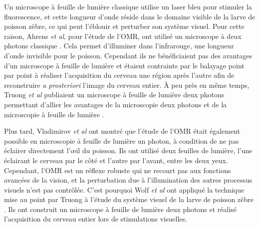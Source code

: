 Un microscope à feuille de lumière classique utilise un laser bleu pour stimuler la fluorescence, et cette longueur d'onde réside dans le domaine visible de la larve de poisson zèbre, ce qui peut l'éblouir et perturber son système visuel. Pour cette raison, Ahrens \emph{et al}, pour l'étude de l'OMR, ont utilisé un microscope à deux photons classique \cite{ahrens_brain-wide_2012}. Cela permet d'illuminer dans l'infrarouge, une longueur d'onde invisible pour le poisson. Cependant ils ne bénéficiaient pas des avantages d'un microscope à feuille de lumière et étaient contraints par le balayage point par point à réaliser l'acquisition du cerveau une région après l'autre afin de reconstruire \emph{a prosteriori} l'image du cerveau entier. À peu près en même temps, Truong \emph{et al} publiaient un microscope à feuille de lumière deux photons permettant d'allier les avantages de la microscopie deux photons et de la microscopie à feuille de lumière \cite{truong_deep_2011}.



Plus tard, Vladimirov \emph{et al} \cite{vladimirov_light-sheet_2014} ont montré que l'étude de l'OMR était également possible en microscopie à feuille de lumière un photon, à condition de ne pas éclairer directement l'œil du poisson. Ils ont utilisé deux feuilles de lumière, l'une éclairant le cerveau par le côté et l'autre par l'avant, entre les deux yeux. Cependant, l'OMR est un réflexe robuste qui ne recourt pas aux fonctions avancées de la vision, et la perturbation due à l'illumination des autres processus visuels n'est pas contrôlée. C'est pourquoi Wolf \emph{et al} ont appliqué la technique mise au point par Truong à l'étude du système visuel de la larve de poisson zèbre \cite{wolf_whole-brain_2015}. Ils ont construit un microscope à feuille de lumière deux photons et réalisé l'acquisition du cerveau entier lors de stimulations visuelles.

